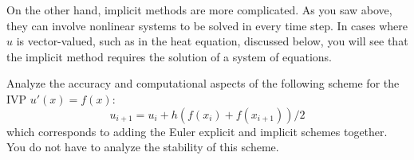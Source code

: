 On the other hand, implicit methods are more complicated. As you saw
above, they can involve nonlinear systems to be solved in every time step. 
In cases where $u$ is vector-valued, such as in the heat equation,
discussed below, you will see 
that the implicit method requires the solution of a system of
equations.

\begin{exercise}
  Analyze the accuracy and computational aspects of the following
scheme for the IVP $u'(x)=f(x)$:
\begin{equation}
  u_{i+1}=u_i+h(f(x_i)+f(x_{i+1}))/2
\end{equation}which corresponds to adding
the Euler explicit and implicit schemes together. You do not have
to analyze the stability of this scheme.
\end{exercise}

